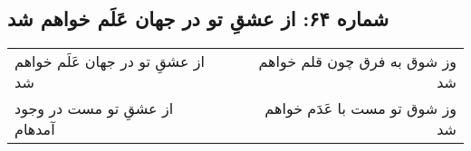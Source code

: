 \begin{center}
\section*{شماره ۶۴: از عشقِ تو در جهان عَلَم خواهم شد}
\label{sec:064}
\begin{longtable}{l p{0.5cm} r}
از عشقِ تو در جهان عَلَم خواهم شد
&&
وز شوق به فرق چون قلم خواهم شد
\\
از عشقِ تو مست در وجود آمدهام
&&
وز شوق تو مست با عَدَم خواهم شد
\\
\end{longtable}
\end{center}
